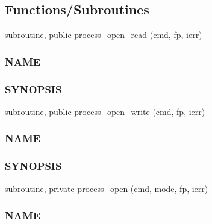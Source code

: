 \subsection*{Functions/\+Subroutines}
\begin{DoxyCompactItemize}
\item 
\hyperlink{M__stopwatch_83_8txt_acfbcff50169d691ff02d4a123ed70482}{subroutine}, \hyperlink{M__stopwatch_83_8txt_a2f74811300c361e53b430611a7d1769f}{public} \hyperlink{namespacem__process_aaaf4d1926258a4cec7da7fc61c38c79d}{process\+\_\+open\+\_\+read} (cmd, fp, ierr)
\begin{DoxyCompactList}\small\item\em \subsubsection*{N\+A\+ME}

\subsubsection*{S\+Y\+N\+O\+P\+S\+IS}\end{DoxyCompactList}\item 
\hyperlink{M__stopwatch_83_8txt_acfbcff50169d691ff02d4a123ed70482}{subroutine}, \hyperlink{M__stopwatch_83_8txt_a2f74811300c361e53b430611a7d1769f}{public} \hyperlink{namespacem__process_aa6ed1404ab3472f5068ed15a7a01defc}{process\+\_\+open\+\_\+write} (cmd, fp, ierr)
\begin{DoxyCompactList}\small\item\em \subsubsection*{N\+A\+ME}

\subsubsection*{S\+Y\+N\+O\+P\+S\+IS}\end{DoxyCompactList}\item 
\hyperlink{M__stopwatch_83_8txt_acfbcff50169d691ff02d4a123ed70482}{subroutine}, private \hyperlink{namespacem__process_a3c0f543a9ceff2671041d73660f60a59}{process\+\_\+open} (cmd, mode, fp, ierr)
\begin{DoxyCompactList}\small\item\em \subsubsection*{N\+A\+ME}


\end{DoxyCompactList}
\end{DoxyCompactItemize}
